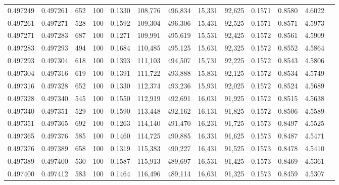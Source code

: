 \begin{tabular}{rrrrrrrrrrrrr}
0.497249 & 0.497261 &   652 & 100 &                                     0.1330 & 108,776 & 496,834 &  15,331 &  92,625 & 0.1571 & 0.8580 & 4.6022 \\
0.497261 & 0.497271 &   528 & 100 &                                     0.1592 & 109,304 & 496,306 &  15,431 &  92,525 & 0.1571 & 0.8571 & 4.5973 \\
0.497271 & 0.497283 &   687 & 100 &                                     0.1271 & 109,991 & 495,619 &  15,531 &  92,425 & 0.1572 & 0.8561 & 4.5909 \\
0.497283 & 0.497293 &   494 & 100 &                                     0.1684 & 110,485 & 495,125 &  15,631 &  92,325 & 0.1572 & 0.8552 & 4.5864 \\
0.497293 & 0.497304 &   618 & 100 &                                     0.1393 & 111,103 & 494,507 &  15,731 &  92,225 & 0.1572 & 0.8543 & 4.5806 \\
0.497304 & 0.497316 &   619 & 100 &                                     0.1391 & 111,722 & 493,888 &  15,831 &  92,125 & 0.1572 & 0.8534 & 4.5749 \\
0.497316 & 0.497328 &   652 & 100 &                                     0.1330 & 112,374 & 493,236 &  15,931 &  92,025 & 0.1572 & 0.8524 & 4.5689 \\
0.497328 & 0.497340 &   545 & 100 &                                     0.1550 & 112,919 & 492,691 &  16,031 &  91,925 & 0.1572 & 0.8515 & 4.5638 \\
0.497340 & 0.497351 &   529 & 100 &                                     0.1590 & 113,448 & 492,162 &  16,131 &  91,825 & 0.1572 & 0.8506 & 4.5589 \\
0.497351 & 0.497365 &   692 & 100 &                                     0.1263 & 114,140 & 491,470 &  16,231 &  91,725 & 0.1573 & 0.8497 & 4.5525 \\
0.497365 & 0.497376 &   585 & 100 &                                     0.1460 & 114,725 & 490,885 &  16,331 &  91,625 & 0.1573 & 0.8487 & 4.5471 \\
0.497376 & 0.497389 &   658 & 100 &                                     0.1319 & 115,383 & 490,227 &  16,431 &  91,525 & 0.1573 & 0.8478 & 4.5410 \\
0.497389 & 0.497400 &   530 & 100 &                                     0.1587 & 115,913 & 489,697 &  16,531 &  91,425 & 0.1573 & 0.8469 & 4.5361 \\
0.497400 & 0.497412 &   583 & 100 &                                     0.1464 & 116,496 & 489,114 &  16,631 &  91,325 & 0.1573 & 0.8459 & 4.5307 \\

\end{tabular}
